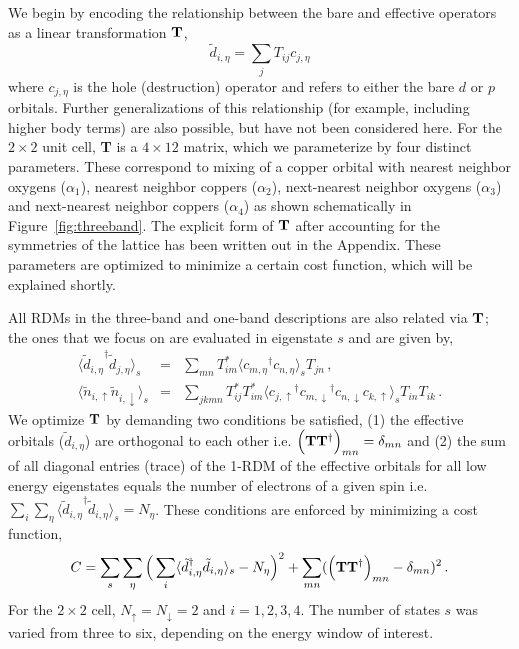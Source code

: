 We begin by encoding the relationship between the bare and effective operators as a linear transformation ${\bf T}$, 
\begin{equation}
	\tilde{d}_{i,\eta} = \sum_{j} T_{ij} c_{j,\eta}
\label{eq:dc}
\end{equation}
where $c_{j,\eta}$ is the hole (destruction) operator and refers to either the bare $d$ or $p$ orbitals. 
Further generalizations of this relationship (for example, including higher body terms) are also possible, but have not been considered here. 
For the $2\times2$ unit cell, {\bf T} is a $4 \times 12 $ matrix, which we parameterize by 
four distinct parameters. These correspond to mixing of a copper orbital 
with nearest neighbor oxygens ($\alpha_1$), nearest neighbor coppers ($\alpha_2$), next-nearest neighbor oxygens ($\alpha_3$) 
and next-nearest neighbor coppers ($\alpha_4$) as shown schematically in Figure~\ref{fig:threeband}. 
The explicit form of ${\bf T}$ after accounting for the symmetries of the 
lattice has been written out in the Appendix. These parameters are optimized to minimize a certain cost function, 
which will be explained shortly. 

All RDMs in the three-band and one-band descriptions are also related via ${\bf T}$; 
the ones that we focus on are evaluated in eigenstate $s$ and are given by,
\begin{subequations}
\begin{eqnarray}
	\langle {\tilde{d}_{i,\eta}}^{\dagger} \tilde{d}_{j,\eta} \rangle_{s} &=& \sum_{mn} T^{*}_{im} \langle {c_{m,\eta}}^{\dagger} c_{n,\eta} \rangle_{s} T_{jn} \label{eq:dmstransformations1} \,,\\
	\langle \tilde{n}_{i,\uparrow} \tilde{n}_{i,\downarrow} \rangle_{s} &=& \sum_{jkmn} T^{*}_{ij} T^{*}_{im} \langle {c_{j,\uparrow}}^{\dagger} {c_{m,\downarrow}}^{\dagger} c_{n,\downarrow} c_{k,\uparrow} \rangle_{s} T_{in} T_{ik}\,.
\label{eq:dmstransformations2}
\end{eqnarray}
\end{subequations}
We optimize ${\bf T}$ by demanding two conditions be satisfied, (1) the effective orbitals ($\tilde{d}_{i,\eta}$) 
are orthogonal to each other i.e. $\Big({\bf T} {\bf T}^{\dagger}\Big)_{mn} = \delta_{mn}$
and (2) the sum of all diagonal entries (trace) of the 1-RDM of the effective orbitals for all low energy eigenstates 
equals the number of electrons of a given spin i.e. $\sum_{i} \sum_{\eta} \langle {\tilde{d}_{i,\eta}}^{\dagger} \tilde{d}_{i,\eta} \rangle_{s} = N_{\eta}$. 
These conditions are enforced by minimizing a cost function,
\begin{equation}
C = \sum_{s} \sum_{\eta} \Big( \sum_{i} \langle \tilde{d}_{i,\eta}^{\dagger} \tilde{d}_{i,\eta} \rangle_{s} - N_{\eta} \Big)^{2} + \sum_{mn} ( \Big({\bf T} {\bf T}^{\dagger}\Big)_{mn} -\delta_{mn})^{2}\,.
\label{eq:C}
\end{equation} 
For the $2\times2$ cell, $N_{\uparrow}=N_{\downarrow}=2$ and $i=1,2,3,4$. 
The number of states $s$ was varied from three to six, depending on the energy window of interest.  

